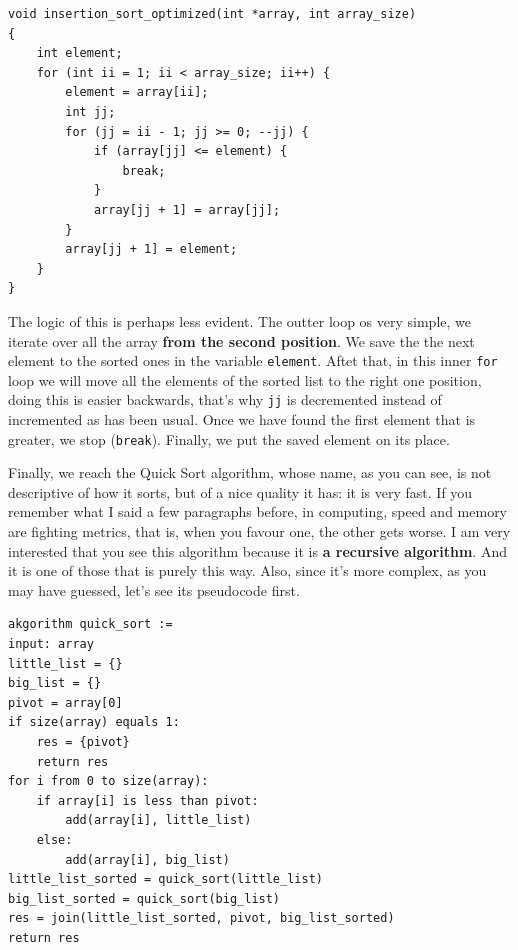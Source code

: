 \documentclass[a4paper]{article}
\begin{document}
\noindent
\begin{minipage}[H]{\linewidth}
\mbox{}
\begin{lstlisting}[style=C, label={lst:insertionOptimized},
caption={Alternative implementation of insertion algorithm}]
void insertion_sort_optimized(int *array, int array_size)
{
    int element;
    for (int ii = 1; ii < array_size; ii++) {
        element = array[ii];
        int jj;
        for (jj = ii - 1; jj >= 0; --jj) {
            if (array[jj] <= element) {
                break;
            }
            array[jj + 1] = array[jj];
        }
        array[jj + 1] = element;
    }
}
\end{lstlisting}
\end{minipage}

The logic of this is perhaps less evident. The outter loop os very simple, we
iterate over all the array \textbf{from the second position}. We save the
the next element to the sorted ones in the variable \verb!element!. Aftet that,
in this inner \verb!for! loop we will move all the elements of the sorted list
to the right one position, doing this is easier backwards, that's why \verb!jj!
is decremented instead of incremented as has been usual. Once we have found the
first element that is greater, we stop (\verb!break!). Finally, we put the
saved element on its place.

Finally, we reach the Quick Sort algorithm, whose name, as you can see, is not
descriptive of how it sorts, but of a nice quality it has: it is very fast. If
you remember what I said a few paragraphs before, in computing, speed and
memory are fighting metrics, that is, when you favour one, the other gets worse.
I am very interested that you see this algorithm because it is \textbf{a
recursive algorithm}. And it is one of those that is purely this way. Also,
since it's more complex, as you may have guessed, let's see its pseudocode first.

\noindent
\begin{minipage}[H]{\linewidth}
\begin{lstlisting}[style=pseudoCode]
akgorithm quick_sort :=
input: array
little_list = {}
big_list = {}
pivot = array[0]
if size(array) equals 1:
    res = {pivot}
    return res
for i from 0 to size(array):
    if array[i] is less than pivot:
        add(array[i], little_list)
    else:
        add(array[i], big_list)
little_list_sorted = quick_sort(little_list)
big_list_sorted = quick_sort(big_list)
res = join(little_list_sorted, pivot, big_list_sorted)
return res
\end{lstlisting}
\end{minipage}
\end{document}

